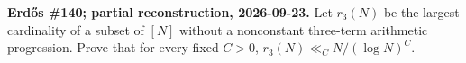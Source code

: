 \textbf{Erd\H{o}s \#140; partial reconstruction, 2026-09-23.}
Let $r_3(N)$ be the largest cardinality of a subset of $[N]$ without a
nonconstant three-term arithmetic progression. Prove that for every
fixed $C>0$, $r_3(N)\ll_C N/(\log N)^C$.
